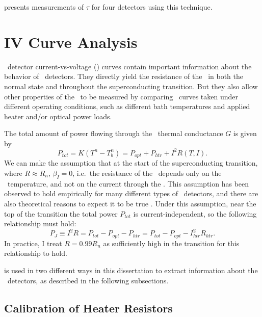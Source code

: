  presents measurements of $\tau$ for four detectors using this technique.

\section{\textsc{IV} Curve Analysis} \label{sec:ch3-iv-curve}

\TES\ detector current-vs-voltage (\IV) curves contain important information about the behavior of \TES\ detectors.
They directly yield the resistance of the \TES\ in both the normal state and throughout the superconducting transition.
But they also allow other properties of the \TES\ to be measured by comparing \IV\ curves taken under different operating conditions, such as different bath temperatures and applied heater and/or optical power loads.

The total amount of power flowing through the \TES\ thermal conductance $G$ is given by
\begin{equation}\label{eqn:ch3-tes-ptot}
P_{tot} = K(T^n - T_b^n) = P_{opt} + P_{htr} + I^2 R(T,I).
\end{equation}
We can make the assumption that at the start of the superconducting transition, where $R \approx R_n$, $\beta_I = 0$, i.e.\ the resistance of the \TES\ depends only on the \TES\ temperature, and not on the current through the \TES.
This assumption has been observed to hold empirically for many different types of \TES\ detectors, and there are also theoretical reasons to expect it to be true \cite{bennett_resistance_2013}.
Under this assumption, near the top of the transition the total power $P_{tot}$ is current-independent, so the following relationship must hold:
\begin{equation}\label{eqn:ch3-ptot-99Rn}
P_{J} \equiv I^2 R = P_{tot} - P_{opt} - P_{htr} = P_{tot} - P_{opt} - I_{htr}^2 R_{htr}.
\end{equation}
In practice, I treat $R = 0.99 R_n$ as sufficiently high in the transition for this relationship to hold.

 is used in two different ways in this dissertation to extract information about the \TES\ detectors, as described in the following subsections.

\subsection{Calibration of Heater Resistors}

